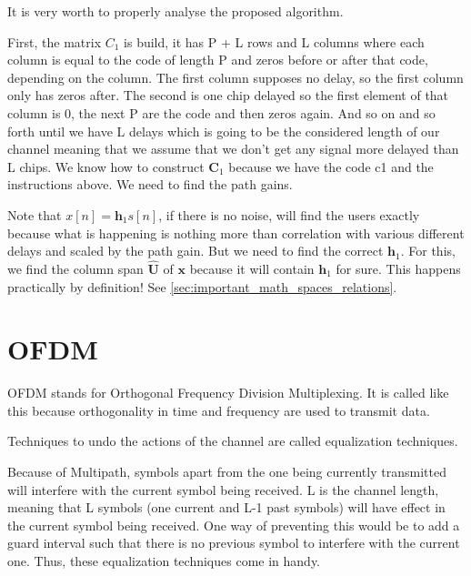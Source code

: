 \documentclass[12pt, a4paper]{article}
\begin{document}
\par It is very worth to properly analyse the proposed algorithm. 
\par First, the matrix $C_1$ is build, it has P + L rows and L columns where each column is equal to the code of length P and zeros before or after that code, depending on the column. The first column supposes no delay, so the first column only has zeros after. The second is one chip delayed so the first element of that column is 0, the next P are the code and then zeros again. And so on and so forth until we have L delays which is going to be the considered length of our channel meaning that we assume that we don't get any signal more delayed than L chips. We know how to construct $\mathbf{C}_1$ because we have the code c1 and the instructions above. We need to find the path gains.
\par Note that $ x[n] = \mathbf{h}_1 s[n]$, if there is no noise, will find the users exactly because what is happening is nothing more than correlation with various different delays and scaled by the path gain. But we need to find the correct $\mathbf{h}_1$. For this, we find the column span $\mathbf{\hat{U}}$ of $\mathbf{x}$ because it will contain $\mathbf{h}_1$ for sure. This happens practically by definition! See \ref{sec:important_math_spaces_relations}.



\section{OFDM}

\par OFDM stands for Orthogonal Frequency Division Multiplexing. It is called like this because orthogonality in time and frequency are used to transmit data.

\par Techniques to undo the actions of the channel are called equalization techniques.

Because of Multipath, symbols apart from the one being currently transmitted will interfere with the current symbol being received. L is the channel length, meaning that L symbols (one current and L-1 past symbols) will have effect in the current symbol being received. One way of preventing this would be to add a guard interval such that there is no previous symbol to interfere with the current one. Thus, these equalization techniques come in handy.
\end{document}
